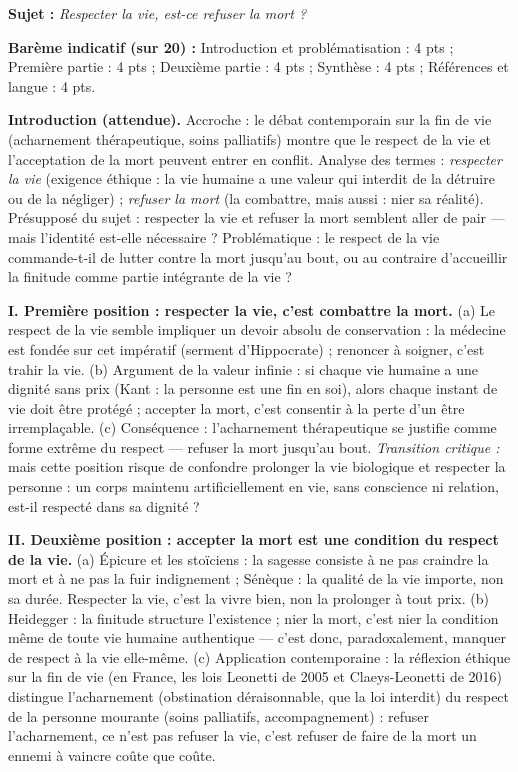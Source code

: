 \documentclass[11pt]{article}
\begin{document}
\begin{corrige}
\textbf{Sujet :} \emph{Respecter la vie, est-ce refuser la mort ?}

\textbf{Barème indicatif (sur 20) :} Introduction et problématisation : 4 pts ; Première partie : 4 pts ; Deuxième partie : 4 pts ; Synthèse : 4 pts ; Références et langue : 4 pts.

\textbf{Introduction (attendue).} Accroche : le débat contemporain sur la fin de vie (acharnement thérapeutique, soins palliatifs) montre que le respect de la vie et l'acceptation de la mort peuvent entrer en conflit. Analyse des termes : \emph{respecter la vie} (exigence éthique : la vie humaine a une valeur qui interdit de la détruire ou de la négliger) ; \emph{refuser la mort} (la combattre, mais aussi : nier sa réalité). Présupposé du sujet : respecter la vie et refuser la mort semblent aller de pair — mais l'identité est-elle nécessaire ? Problématique : le respect de la vie commande-t-il de lutter contre la mort jusqu'au bout, ou au contraire d'accueillir la finitude comme partie intégrante de la vie ?

\textbf{I. Première position : respecter la vie, c'est combattre la mort.} (a) Le respect de la vie semble impliquer un devoir absolu de conservation : la médecine est fondée sur cet impératif (serment d'Hippocrate) ; renoncer à soigner, c'est trahir la vie. (b) Argument de la valeur infinie : si chaque vie humaine a une dignité sans prix (Kant : la personne est une fin en soi), alors chaque instant de vie doit être protégé ; accepter la mort, c'est consentir à la perte d'un être irremplaçable. (c) Conséquence : l'acharnement thérapeutique se justifie comme forme extrême du respect — refuser la mort jusqu'au bout. \emph{Transition critique :} mais cette position risque de confondre prolonger la vie biologique et respecter la personne : un corps maintenu artificiellement en vie, sans conscience ni relation, est-il respecté dans sa dignité ?

\textbf{II. Deuxième position : accepter la mort est une condition du respect de la vie.} (a) Épicure et les stoïciens : la sagesse consiste à ne pas craindre la mort et à ne pas la fuir indignement ; Sénèque : la qualité de la vie importe, non sa durée. Respecter la vie, c'est la vivre bien, non la prolonger à tout prix. (b) Heidegger : la finitude structure l'existence ; nier la mort, c'est nier la condition même de toute vie humaine authentique — c'est donc, paradoxalement, manquer de respect à la vie elle-même. (c) Application contemporaine : la réflexion éthique sur la fin de vie (en France, les lois Leonetti de 2005 et Claeys-Leonetti de 2016) distingue l'acharnement (obstination déraisonnable, que la loi interdit) du respect de la personne mourante (soins palliatifs, accompagnement) : refuser l'acharnement, ce n'est pas refuser la vie, c'est refuser de faire de la mort un ennemi à vaincre coûte que coûte.


\end{corrige}
\end{document}
